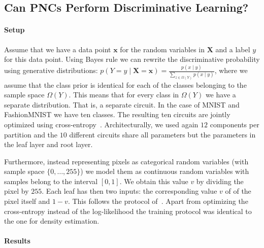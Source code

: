 \documentclass[letterpaper]{article} %
\newcommand{\Xvars}{\ensuremath{\mathbf{X}}}
\newcommand{\xvars}{\ensuremath{\mathbf{x}}}
\begin{document}
\subsection{Can PNCs Perform Discriminative Learning?}
\paragraph*{Setup}
Assume that we have a data point $\xvars$ for the random variables in $\Xvars$ and a label $y$ for this data point. Using Bayes rule we can rewrite the discriminative probability using generative distributions:
$
	p(Y{=}y{\mid} \Xvars{=}\xvars )
	{=}
	\frac{
		p(x{\mid} y)
	}
	{
		\sum_{z\in \Omega(Y)} p(x{\mid} y)
	}
$,
where we assume that the class prior is identical for each of the classes belonging to the sample space $\Omega(Y)$. This means that for every class in $\Omega(Y)$ we have a separate distribution. That is, a separate circuit. In the case of MNIST and FashionMNIST we have ten classes. The resulting ten circuits are jointly optimized using cross-entropy~\citep{peharz2019random}.
Architecturally, we used again $12$ components per partition and the $10$ different circuits share all parameters but the parameters in the leaf layer and root layer.

Furthermore, instead representing pixels as categorical random variables (with sample space $\{0,\dots, 255 \}$) we model them as continuous random variables with samples belong to the interval $[0,1]$. We obtain this value $v$ by dividing the pixel by $255$. Each leaf has then two inputs: the corresponding value $v$ of of the pixel itself and $1-v$.
This follows the protocol of~\citep[]{liang2019learning}.
Apart from optimizing the cross-entropy instead of the log-likelihood the training protocol was identical to the one for density estimation.



\paragraph*{Results}
\end{document}

